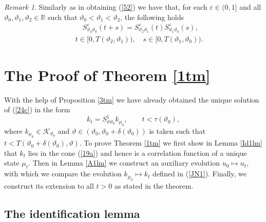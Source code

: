 \documentclass[reqno,11pt]{amsart}
\theoremstyle{definition}
\theoremstyle{remark}
\newtheorem{remark}[theorem]{Remark}
\numberwithin{equation}{section}
\begin{document}
\begin{remark}
  \label{Decrk}
Similarly as in obtaining (\ref{52}) we have that, for each
$\varepsilon \in (0,1]$ and all $\vartheta_0, \vartheta_1,
\vartheta_2 \in \mathds{R}$ such that $\vartheta_0 < \vartheta_1 <
\vartheta_2$, the following holds
\begin{eqnarray}
  \label{D1}
& & \quad S^\varepsilon_{\vartheta_2 \vartheta_0} (t+s) =
S^\varepsilon_{\vartheta_2 \vartheta_1} (t)
S^\varepsilon_{\vartheta_1
\vartheta_0} (s), \\[.2cm] & &  t\in [0, T(\vartheta_2, \vartheta_1)), \quad s \in [0,
T(\vartheta_1, \vartheta_0)). \nonumber
\end{eqnarray}
\end{remark}

\section{The Proof of Theorem \ref{1tm}}
\label{SPr}

With the help of Proposition \ref{3tm} we have already obtained the
unique solution of (\ref{24c}) in the form \begin{equation}
  \label{JN1}
k_t = S^1_{\vartheta \vartheta_0} k_{\mu_0}, \qquad t< \tau
(\vartheta_0),
\end{equation}
where $k_{\mu_0} \in \mathcal{K}_{\vartheta_0}$ and $\vartheta \in(
\vartheta_0 , \vartheta_0 + \delta(\vartheta_0))$ is taken such that
$t < T(\vartheta_0 + \delta(\vartheta_0),\vartheta)$. To prove
Theorem \ref{1tm} we first show in Lemma \ref{Id1lm}  that $k_t$
lies in the cone (\ref{19a}) and hence is a correlation function of
a unique state $\mu_t$. Then in Lemma \ref{A1lm} we construct an
auxiliary evolution $u_0 \mapsto u_t$, with which we compare the
evolution $k_{\mu_0} \mapsto k_t$ defined in (\ref{JN1}). Finally,
we construct its extension to all $t>0$ as stated in the theorem.

\subsection{The identification lemma}
\end{document}
